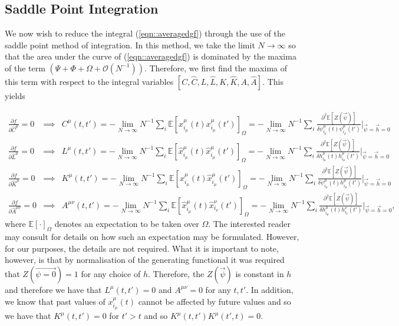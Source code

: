 \documentclass{article}
\newcommand{\xmu}[2]{x_{#1_#2}^{#2}(t)}
\newcommand{\xmudash}[2]{x_{#1_#2}^{#2}(t')}
\newcommand{\hxmu}[1]{\hat{x}_{#1_\mu}^{\mu} (t)}
\newcommand{\hxmudash}[1]{\hat{x}_{#1_\mu}^{\mu} (t')}
\newcommand{\hxnudash}[1]{\hat{x}_{#1_\nu}^{\nu} (t')}
\begin{document}
\subsection{Saddle Point Integration}

We now wish to reduce the integral (\ref{eqn::averagedgf}) through the use of the saddle point method of integration. In this method, we take the limit $N \rightarrow \infty$ so that the area under the curve of (\ref{eqn::averagedgf}) is dominated by the maxima of the term $(\Psi + \Phi + \Omega + \mathcal{O}(N^{-1}))$. Therefore, we first find the maxima of this term with respect to the integral variables $[C, \hat{C}, L, \hat{L}, K, \hat{K}, A, \hat{A}]$. This yields

\begin{eqnarray}
\frac{\partial f}{\partial \hat{C}^\mu} = 0  & \implies & C^\mu (t, t') =  - \lim_{N \rightarrow \infty} N^{-1} \sum_i \mathbb{E}[\xmu{i}{\mu} \xmudash{i}{\mu}]_{\Omega}  = - \lim_{N \rightarrow \infty} N^{-1} \sum_i \frac{\partial^2 \mathbb{E}[Z(\Vec{\psi})]}{\delta \psi_{i_\mu}^\mu (t) \psi_{i_\mu}^\mu (t')} \Big \rvert_{\Vec{\psi} = \Vec{h} = 0} \\
\frac{\partial f}{\partial \hat{L}^\mu} = 0  & \implies & L^\mu (t, t') =  - \lim_{N \rightarrow \infty} N^{-1} \sum_i \mathbb{E}[\hxmu{i} \hxmudash{i}]_{\Omega}  = - \lim_{N \rightarrow \infty} N^{-1} \sum_i \frac{\partial^2 \mathbb{E}[Z(\Vec{\psi})]}{\delta h_{i_\mu}^\mu (t) h_{i_\mu}^\mu (t')} \Big \rvert_{\Vec{\psi} = \Vec{h} = 0} \\
\frac{\partial f}{\partial \hat{K}^\mu} = 0  & \implies & K^\mu (t, t') =  - \lim_{N \rightarrow \infty} N^{-1} \sum_i \mathbb{E}[\xmu{i}{\mu} \hxmudash{i}]_{\Omega}  = - \lim_{N \rightarrow \infty} N^{-1} \sum_i \frac{\partial^2 \mathbb{E}[Z(\Vec{\psi})]}{\delta \psi_{i_\mu}^\mu (t) h_{i_\mu}^\mu (t')} \Big \rvert_{\Vec{\psi} = \Vec{h} = 0} \\
\frac{\partial f}{\partial \hat{A}^{\mu \nu}} = 0  & \implies & A^{\mu \nu} (t, t') =  - \lim_{N \rightarrow \infty} N^{-1} \sum_i \mathbb{E}[\hxmu{i} \hxnudash{i}]_{\Omega}  = - \lim_{N \rightarrow \infty} N^{-1} \sum_i \frac{\partial^2 \mathbb{E}[Z(\Vec{\psi})]}{\delta h_{i_\mu}^\mu (t) h_{i_\nu}^\nu (t')} \Big \rvert_{\Vec{\psi} = \Vec{h} = 0},
\end{eqnarray}
%
where $\mathbb{E}[ \cdot ]_\Omega$ denotes an expectation to be taken over $\Omega$. The interested reader may consult \cite{Coolen2005} for details on how such an expectation may be formulated. However, for our purposes, the details are not required. What it is important to note, however, is that by normalisation of the generating functional it was required that $Z(\Vec{\psi = 0}) = 1$ for any choice of $h$. Therefore, the $Z(\Vec{\psi})$ is constant in $h$ and therefore we have that $L^\mu (t, t') = 0$ and $A^{\mu \nu} = 0$ for any $t, t'$. In addition, we know that past values of $\xmu{i}{\mu}$ cannot be affected by future values and so we have that $K^\mu(t, t') = 0$ for $t' > t$ and so $K^\mu(t, t') K^\mu(t', t) = 0$.
\end{document}
